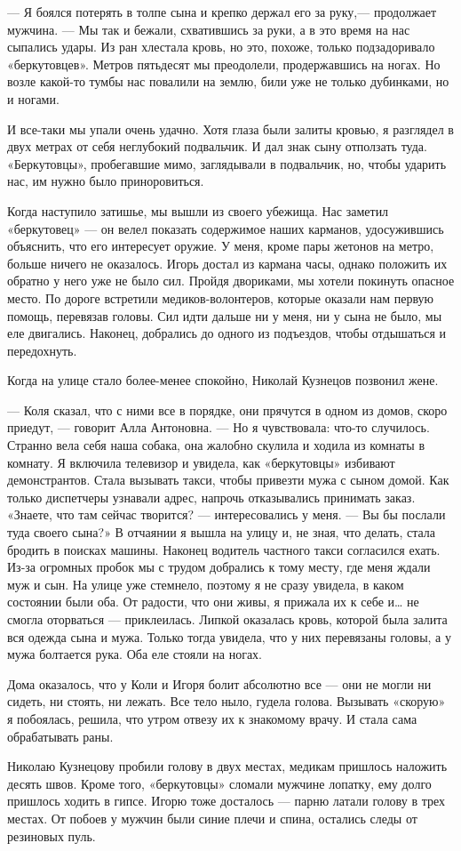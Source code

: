 — Я боялся потерять в толпе сына и крепко держал его за руку,— продолжает
мужчина. — Мы так и бежали, схватившись за руки, а в это время на нас сыпались
удары. Из ран хлестала кровь, но это, похоже, только подзадоривало
«беркутовцев». Метров пятьдесят мы преодолели, продержавшись на ногах. Но возле
какой-то тумбы нас повалили на землю, били уже не только дубинками, но и
ногами.

И все-таки мы упали очень удачно. Хотя глаза были залиты кровью, я разглядел в
двух метрах от себя неглубокий подвальчик. И дал знак сыну отползать туда.
«Беркутовцы», пробегавшие мимо, заглядывали в подвальчик, но, чтобы ударить
нас, им нужно было приноровиться.

Когда наступило затишье, мы вышли из своего убежища. Нас заметил «беркутовец» —
он велел показать содержимое наших карманов, удосужившись объяснить, что его
интересует оружие. У меня, кроме пары жетонов на метро, больше ничего не
оказалось. Игорь достал из кармана часы, однако положить их обратно у него уже
не было сил. Пройдя двориками, мы хотели покинуть опасное место. По дороге
встретили медиков-волонтеров, которые оказали нам первую помощь, перевязав
головы. Сил идти дальше ни у меня, ни у сына не было, мы еле двигались.
Наконец, добрались до одного из подъездов, чтобы отдышаться и передохнуть.

Когда на улице стало более-менее спокойно, Николай Кузнецов позвонил жене.

— Коля сказал, что с ними все в порядке, они прячутся в одном из домов, скоро
приедут, — говорит Алла Антоновна. — Но я чувствовала: что-то случилось.
Странно вела себя наша собака, она жалобно скулила и ходила из комнаты в
комнату. Я включила телевизор и увидела, как «беркутовцы» избивают
демонстрантов. Стала вызывать такси, чтобы привезти мужа с сыном домой. Как
только диспетчеры узнавали адрес, напрочь отказывались принимать заказ.
«Знаете, что там сейчас творится? — интересовались у меня. — Вы бы послали туда
своего сына?» В отчаянии я вышла на улицу и, не зная, что делать, стала бродить
в поисках машины. Наконец водитель частного такси согласился ехать. Из-за
огромных пробок мы с трудом добрались к тому месту, где меня ждали муж и сын.
На улице уже стемнело, поэтому я не сразу увидела, в каком состоянии были оба.
От радости, что они живы, я прижала их к себе и… не смогла оторваться —
приклеилась. Липкой оказалась кровь, которой была залита вся одежда сына и
мужа. Только тогда увидела, что у них перевязаны головы, а у мужа болтается
рука. Оба еле стояли на ногах.

Дома оказалось, что у Коли и Игоря болит абсолютно все — они не могли ни
сидеть, ни стоять, ни лежать. Все тело ныло, гудела голова. Вызывать «скорую» я
побоялась, решила, что утром отвезу их к знакомому врачу. И стала сама
обрабатывать раны.

Николаю Кузнецову пробили голову в двух местах, медикам пришлось наложить
десять швов. Кроме того, «беркутовцы» сломали мужчине лопатку, ему долго
пришлось ходить в гипсе. Игорю тоже досталось — парню латали голову в трех
местах. От побоев у мужчин были синие плечи и спина, остались следы от
резиновых пуль.
